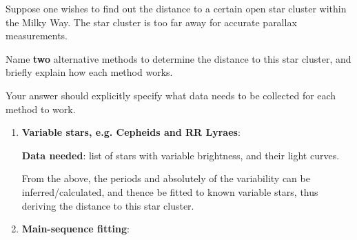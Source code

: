 \documentclass[a4paper,11pt]{exam}
\begin{document}
\begin{questions}

\setcounter{question}{9}
\question[6]
	Suppose one wishes to find out the distance to a certain open star cluster within the Milky Way. The star cluster is too far away for accurate parallax measurements. 
	
	Name \textbf{two} alternative methods to determine the distance to this star cluster, and briefly explain how each method works. 
	
	Your answer should explicitly specify what data needs to be collected for each method to work.
	\droppoints 
	\begin{solution}
		\begin{enumerate}[leftmargin=12pt]
			\item \textbf{Variable stars, e.g. Cepheids and RR Lyraes}: 
			
			\textbf{Data needed}: list of stars with variable brightness, and their light curves. 
			
			From the above, the periods and absolutely of the variability can be inferred/calculated, and thence be fitted to known variable stars, thus deriving the distance to this star cluster.
			\item \textbf{Main-sequence fitting}: 
			

\end{enumerate}
\end{solution}
\end{questions}
\end{document}
